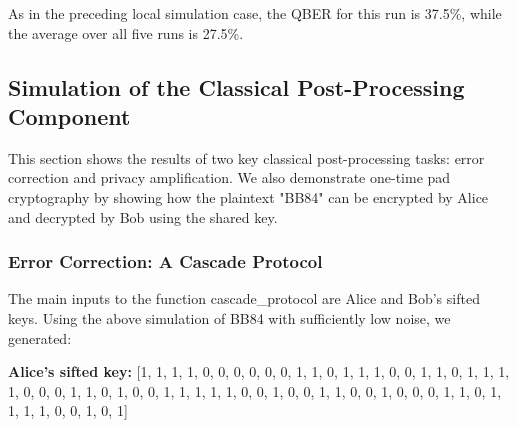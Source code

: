 \noindent
{}

As in the preceding local simulation case, the QBER for this run is 37.5\%, while the average over all five runs is 27.5\%.

\subsection{Simulation of the Classical Post-Processing Component}

This section shows the results of two key classical post-processing tasks: error correction and privacy amplification. 
We also demonstrate one-time pad cryptography by showing how the plaintext "BB84" can be encrypted by Alice and decrypted by Bob using the shared key.

\subsubsection{Error Correction: A Cascade Protocol}

The main inputs to the function cascade\_protocol are Alice and Bob's sifted keys. Using the above simulation of BB84 with sufficiently low noise, we generated:

\textbf{Alice's sifted key:}  [1, 1, 1, 1, 0, 0, 0, 0, 0, 0, 1, 1, 0, 1, 1, 1, 0, 0, 1, 1, 0, 1, 1, 1, 1, 0, 0, 0, 1, 1, 0, 1, 0, 0, 1, 1, 1, 1, 1, 0, 0, 1, 0, 0, 1, 1, 0, 0, 1, 0, 0, 0, 1, 1, 0, 1, 1, 1, 1, 0, 0, 1, 0, 1]

